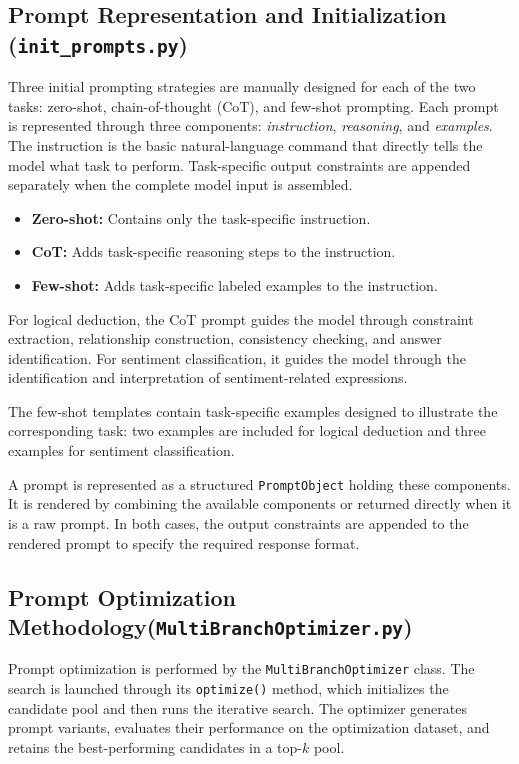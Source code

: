 \documentclass[pdflatex,sn-mathphys-num]{sn-jnl}%
\theoremstyle{thmstyleone}%
\theoremstyle{thmstyletwo}%
\theoremstyle{thmstylethree}%
\begin{document}
\subsection{Prompt Representation and Initialization (\texttt{init\_prompts.py})}

Three initial prompting strategies are manually designed for each of the
two tasks: zero-shot, chain-of-thought (CoT), and few-shot prompting.
Each prompt is represented through three components: \textit{instruction},
\textit{reasoning}, and \textit{examples}. The instruction is the basic
natural-language command that directly tells the model what task to perform.
Task-specific output constraints are appended separately when the complete
model input is assembled.

\begin{itemize}
    \item \textbf{Zero-shot:} Contains only the task-specific instruction.

    \item \textbf{CoT:} Adds task-specific reasoning steps to the instruction.

    \item \textbf{Few-shot:} Adds task-specific labeled examples to the
    instruction.
\end{itemize}

For logical deduction, the CoT prompt guides the model through constraint
extraction, relationship construction, consistency checking, and answer
identification. For sentiment classification, it guides the model through
the identification and interpretation of sentiment-related expressions.

The few-shot templates contain task-specific examples designed to
illustrate the corresponding task: two examples are included for logical
deduction and three examples for sentiment classification.

A prompt is represented as a structured \texttt{PromptObject} holding these
components. It is rendered by combining the available components or returned
directly when it is a raw prompt. In both cases, the output constraints are
appended to the rendered prompt to specify the required response format.

\subsection{Prompt Optimization Methodology(\texttt{MultiBranchOptimizer.py})}

Prompt optimization is performed by the \texttt{MultiBranchOptimizer}
class. The search is launched through its \texttt{optimize()} method, which
initializes the candidate pool and then runs the iterative search. The optimizer
generates prompt variants, evaluates their performance on the optimization
dataset, and retains the best-performing candidates in a top-\(k\) pool.
\end{document}

